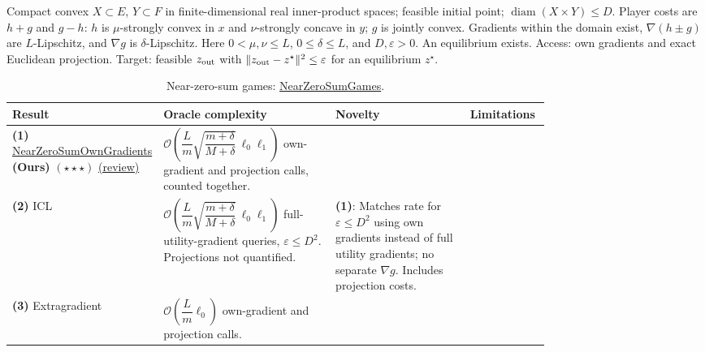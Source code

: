 \begin{table}[tp]
\centering
\caption{Near-zero-sum games: \href{https://github.com/k3nfalt/longtails/blob/main/LongTails/Setups/NearZeroSumGames.lean}{NearZeroSumGames}.}\label{tab:NearZeroSumGames}
\parbox{\linewidth}{\footnotesize Compact convex $X\subset E$, $Y\subset F$ in finite-dimensional real inner-product spaces; feasible initial point; $\operatorname{diam}(X\times Y)\le D$. Player costs are $h+g$ and $g-h$: $h$ is $\mu$-strongly convex in $x$ and $\nu$-strongly concave in $y$; $g$ is jointly convex. Gradients within the domain exist, $\nabla(h\pm g)$ are $L$-Lipschitz, and $\nabla g$ is $\delta$-Lipschitz. Here $0<\mu,\nu\le L$, $0\le\delta\le L$, and $D,\varepsilon>0$. An equilibrium exists. Access: own gradients and exact Euclidean projection. Target: feasible $z_{\rm out}$ with $\|z_{\rm out}-z^\star\|^2\le\varepsilon$ for an equilibrium $z^\star$.}\par\smallskip
\begin{threeparttable}
\footnotesize
\setlength{\tabcolsep}{4pt}\renewcommand{\arraystretch}{1.25}
\begin{tabularx}{\linewidth}{@{}>{\raggedright\arraybackslash}p{0.20\linewidth}>{\raggedright\arraybackslash}p{0.32\linewidth}>{\raggedright\arraybackslash}p{0.25\linewidth}>{\raggedright\arraybackslash}X@{}}
\toprule
\textbf{Result} & \textbf{Oracle complexity} & \textbf{Novelty} & \textbf{Limitations} \\
\midrule
\textbf{(1)} \href{https://github.com/k3nfalt/longtails/blob/main/LongTails/Theorems/NearZeroSumOwnGradients.lean}{Near\allowbreak Zero\allowbreak Sum\allowbreak Own\allowbreak Gradients} \textbf{(Ours)} $(\star\star\star)$ \href{https://github.com/k3nfalt/longtails/blob/main/scripts/reviews/NearZeroSumOwnGradients.md}{(review)}
& $\mathcal{O}\!\left(\dfrac{L}{m}\sqrt{\dfrac{m+\delta}{M+\delta}}\,\ell_0\ell_1\right)$ own-gradient and projection calls, counted together.
& & \\
\midrule[1.2pt]
\textbf{(2)} ICL \citep[Thm.~1]{nzsLuo2025v1}
& $\mathcal{O}\!\left(\dfrac{L}{m}\sqrt{\dfrac{m+\delta}{M+\delta}}\,\ell_0\ell_1\right)$ full-utility-gradient queries, $\varepsilon\le D^2$. Projections not quantified.
& \textbf{(1)}: Matches rate for $\varepsilon\le D^2$ using own gradients instead of full utility gradients; no separate $\nabla g$. Includes projection costs.
& \\
\midrule
\textbf{(3)} Extragradient \citep[Prop.~1]{nzsLuo2025v1}
& $\mathcal{O}\!\left(\dfrac{L}{m}\ell_0\right)$ own-gradient and projection calls.

\end{tabularx}
\end{threeparttable}
\end{table}
